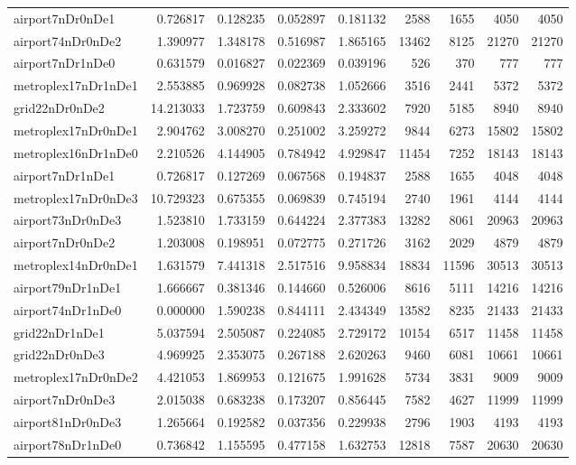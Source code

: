 \begin{longtable}{|l|r|r|r|r|r|r|r|r|}
airport7nDr0nDe1 & 0.726817 & 0.128235 & 0.052897 & 0.181132 & 2588 & 1655 & 4050 & 4050 \\
airport74nDr0nDe2 & 1.390977 & 1.348178 & 0.516987 & 1.865165 & 13462 & 8125 & 21270 & 21270 \\
airport7nDr1nDe0 & 0.631579 & 0.016827 & 0.022369 & 0.039196 & 526 & 370 & 777 & 777 \\
metroplex17nDr1nDe1 & 2.553885 & 0.969928 & 0.082738 & 1.052666 & 3516 & 2441 & 5372 & 5372 \\
grid22nDr0nDe2 & 14.213033 & 1.723759 & 0.609843 & 2.333602 & 7920 & 5185 & 8940 & 8940 \\
metroplex17nDr0nDe1 & 2.904762 & 3.008270 & 0.251002 & 3.259272 & 9844 & 6273 & 15802 & 15802 \\
metroplex16nDr1nDe0 & 2.210526 & 4.144905 & 0.784942 & 4.929847 & 11454 & 7252 & 18143 & 18143 \\
airport7nDr1nDe1 & 0.726817 & 0.127269 & 0.067568 & 0.194837 & 2588 & 1655 & 4048 & 4048 \\
metroplex17nDr0nDe3 & 10.729323 & 0.675355 & 0.069839 & 0.745194 & 2740 & 1961 & 4144 & 4144 \\
airport73nDr0nDe3 & 1.523810 & 1.733159 & 0.644224 & 2.377383 & 13282 & 8061 & 20963 & 20963 \\
airport7nDr0nDe2 & 1.203008 & 0.198951 & 0.072775 & 0.271726 & 3162 & 2029 & 4879 & 4879 \\
metroplex14nDr0nDe1 & 1.631579 & 7.441318 & 2.517516 & 9.958834 & 18834 & 11596 & 30513 & 30513 \\
airport79nDr1nDe1 & 1.666667 & 0.381346 & 0.144660 & 0.526006 & 8616 & 5111 & 14216 & 14216 \\
airport74nDr1nDe0 & 0.000000 & 1.590238 & 0.844111 & 2.434349 & 13582 & 8235 & 21433 & 21433 \\
grid22nDr1nDe1 & 5.037594 & 2.505087 & 0.224085 & 2.729172 & 10154 & 6517 & 11458 & 11458 \\
grid22nDr0nDe3 & 4.969925 & 2.353075 & 0.267188 & 2.620263 & 9460 & 6081 & 10661 & 10661 \\
metroplex17nDr0nDe2 & 4.421053 & 1.869953 & 0.121675 & 1.991628 & 5734 & 3831 & 9009 & 9009 \\
airport7nDr0nDe3 & 2.015038 & 0.683238 & 0.173207 & 0.856445 & 7582 & 4627 & 11999 & 11999 \\
airport81nDr0nDe3 & 1.265664 & 0.192582 & 0.037356 & 0.229938 & 2796 & 1903 & 4193 & 4193 \\
airport78nDr1nDe0 & 0.736842 & 1.155595 & 0.477158 & 1.632753 & 12818 & 7587 & 20630 & 20630 \\

\end{longtable}
